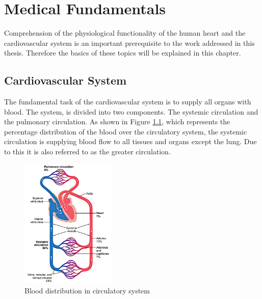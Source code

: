 \chapter{Medical Fundamentals}
Comprehension of the physiological functionality of the human heart and the cardiovascular system is an important prerequisite to the work addressed in this thesis. Therefore the basics of these topics will be explained in this chapter.

\section{Cardiovascular System}
The fundamental task of the cardiovascular system is to supply all organs with blood. The system, is divided into two components. The systemic circulation and the pulmonary circulation. As shown in Figure \ref{fig:circulation}, which represents the percentage distribution of the blood over the circulatory system, the systemic circulation is supplying blood flow to all tissues and organs except the lung. Due to this it is also referred to as the greater circulation. \cite{GH20}
\begin{figure}[h]
  \centering
  \includegraphics[width=0.4\textwidth, height=0.6\textwidth]{images/circulation.jpg}
  \caption{Blood distribution in circulatory system \cite{GH20}}
  \label{fig:circulation}
\end{figure}
